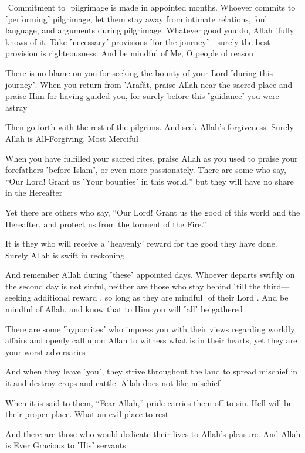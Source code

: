 ˹Commitment to˺ pilgrimage is made in appointed months. Whoever commits to ˹performing˺ pilgrimage, let them stay away from intimate relations, foul language, and arguments during pilgrimage. Whatever good you do, Allah ˹fully˺ knows of it. Take ˹necessary˺ provisions ˹for the journey˺—surely the best provision is righteousness. And be mindful of Me, O people of reason

There is no blame on you for seeking the bounty of your Lord ˹during this journey˺. When you return from ’Arafât, praise Allah near the sacred place and praise Him for having guided you, for surely before this ˹guidance˺ you were astray

Then go forth with the rest of the pilgrims. And seek Allah’s forgiveness. Surely Allah is All-Forgiving, Most Merciful

When you have fulfilled your sacred rites, praise Allah as you used to praise your forefathers ˹before Islam˺, or even more passionately. There are some who say, “Our Lord! Grant us ˹Your bounties˺ in this world,” but they will have no share in the Hereafter

Yet there are others who say, “Our Lord! Grant us the good of this world and the Hereafter, and protect us from the torment of the Fire.”

It is they who will receive a ˹heavenly˺ reward for the good they have done. Surely Allah is swift in reckoning

And remember Allah during ˹these˺ appointed days. Whoever departs swiftly on the second day is not sinful, neither are those who stay behind ˹till the third—seeking additional reward˺, so long as they are mindful ˹of their Lord˺. And be mindful of Allah, and know that to Him you will ˹all˺ be gathered

There are some ˹hypocrites˺ who impress you with their views regarding worldly affairs and openly call upon Allah to witness what is in their hearts, yet they are your worst adversaries

And when they leave ˹you˺, they strive throughout the land to spread mischief in it and destroy crops and cattle. Allah does not like mischief

When it is said to them, “Fear Allah,” pride carries them off to sin. Hell will be their proper place. What an evil place to rest

And there are those who would dedicate their lives to Allah’s pleasure. And Allah is Ever Gracious to ˹His˺ servants

